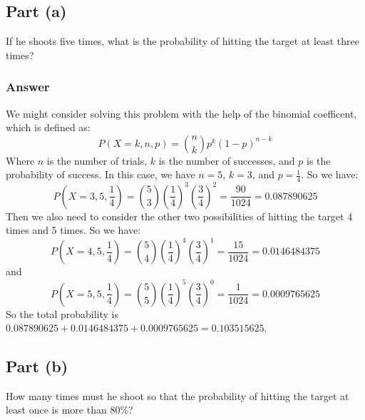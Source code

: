 \documentclass{article}
\begin{document}
\subsection{Part (a)}
If he shoots five times, what is the probability of hitting the target at least three times?
\subsubsection{Answer}
We might consider solving this problem with the help of the binomial coefficent, which is defined as:
\begin{equation}
    P(X =k, n, p) = \binom{n}{k} p^k (1-p)^{n-k}
\end{equation}
Where $n$ is the number of trials, $k$ is the number of successes, and $p$ is the probability of success. In this case, we have $n = 5$, $k = 3$, and $p = \frac{1}{4}$. So we have:
\begin{equation}
    P(X = 3, 5, \frac{1}{4}) = \binom{5}{3} \left(\frac{1}{4}\right)^3 \left(\frac{3}{4}\right)^2 = \frac{90}{1024} = 0.087890625
\end{equation}
Then we also need to consider the other two possibilities of hitting the target 4 times and 5 times. So we have:
\begin{equation}
    P(X = 4, 5, \frac{1}{4}) = \binom{5}{4} \left(\frac{1}{4}\right)^4 \left(\frac{3}{4}\right)^1 = \frac{15}{1024} = 0.0146484375
\end{equation}
and
\begin{equation}
    P(X = 5, 5, \frac{1}{4}) = \binom{5}{5} \left(\frac{1}{4}\right)^5 \left(\frac{3}{4}\right)^0 = \frac{1}{1024} = 0.0009765625
\end{equation}
So the total probability is $0.087890625 + 0.0146484375 + 0.0009765625 = \boxed{0.103515625}$.


\subsection{Part (b)}
How many times must he shoot so that the probability of hitting the target at least once is more than 80\%?
\end{document}
